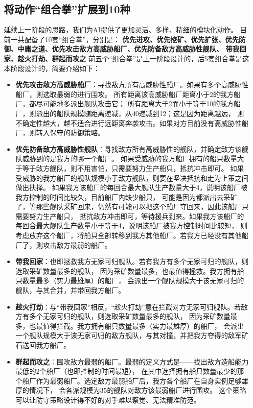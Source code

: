 \documentclass{article}
\begin{document}
\subsection{将动作“组合拳”扩展到10种}
延续上一阶段的思路，我们为AI提供了更加灵活、多样、精细的模块化动作。
目前一共配备了10套“组合拳”，分别是：
\textbf{优先进攻、优先挖矿、优先扩张、优先防御、中庸之道、优先攻击敌方高威胁船厂、优先防备敌方高威胁性舰队、
带我回家、趁火打劫、群起而攻之}
前五个“组合拳”是上一阶段设计的，后5套组合拳是这本阶段设计的，简要介绍如下：
\begin{itemize}
	\item \textbf{优先攻击敌方高威胁船厂}：寻找敌方所有高威胁性船厂。如果有多个高威胁性船厂，则选取最弱的进行围攻。
			所有距离该高威胁船厂距离小于2的我方船厂，都尽可能地多派出舰队攻击它；
			所有距离大于2而小于等于10的我方船厂，则派出的船队规模随距离递减，从40递减到12；这是因为距离越远，
			则不确定性越大，越不适合进行远距离奔袭攻击。如果对方目前没有高威胁性船厂，则转入保守的防御策略。
	\item \textbf{优先防备敌方高威胁性舰队}：寻找敌方所有高威胁性的舰队，并确定敌方该舰队威胁到的是我方的哪一个船厂。
			如果受威胁的我方船厂拥有的船只数量大于等于敌方舰队，则不用害怕，只需要努力生产船只，抵抗冲击即可。
			如果受威胁的我方船厂的舰队规模小于敌方舰队，则要在坚决抵抗和走为上策之间做出抉择。
			如果我方该船厂的每回合最大舰队生产数量大于4，说明该船厂被我方控制的时间比较久，目前船厂内缺少船只，
			可能是因为都派出去采矿了，等那些舰队采矿回来，仍然有可能可以把这个船厂夺回来，因此该船厂只需要努力生产船只，
			抵抗敌方冲击即可，等待援兵到来。如果我方该船厂的每回合最大舰队生产数量小于等于4，说明该船厂被我方控制时间比较短，
			则考虑放弃这个船厂，将船只全部转移到我方其他船厂。若我方已经没有其他船厂了，则攻击敌方最弱的船厂。
	\item \textbf{带我回家}：也即拯救我方无家可归舰队。若有我方有多个无家可归的舰队，则选取采矿数量最多的舰队，
			因为采矿数量最多，也最值得拯救。我方拥有船只数量最多（实力最雄厚）的船厂，
			会派出一个舰队规模大于该无家可归的舰队，与其合并，并带回我方船厂。
	\item \textbf{趁火打劫}：与“带我回家”相反，“趁火打劫”意在拦截对方无家可归舰队。若敌方有多个无家可归的舰队，则选取采矿数量最多的舰队，
			因为采矿数量最多，也最值得拦截。我方拥有船只数量最多（实力最雄厚）的船厂，
			会派出一个舰队规模大于该无家可归的敌方舰队，与其对撞，并把我方夺得的敌军矿石送回我方船厂。
	\item \textbf{群起而攻之}：围攻敌方最弱的船厂。最弱的定义方式是——找出敌方造船能力最低的2个船厂（也即控制的时间最短），
    			在其中选择拥有船只数量最少的那个船厂作为最弱船厂。选定敌方最弱船厂后，我方各个船厂在自身实例足够雄厚的情况下，
				会各派规模为35的舰队对敌方该最弱船厂进行围攻。
				这个策略可以让防守策略设计得不好的对手难以察觉、无法精准防范。
\end{itemize}
\end{document}
